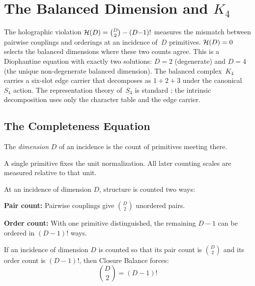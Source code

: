 \section{The Balanced Dimension and $K_4$}
\label{sec:balanced-dimension}

The holographic violation $\mathcal{H}(D) = \binom{D}{2} - (D{-}1)!$ measures the
mismatch between pairwise couplings and orderings at an incidence of~$D$
primitives. $\mathcal{H}(D)=0$ selects the balanced dimensions where these two counts
agree. This is a Diophantine equation with exactly two solutions: $D=2$
(degenerate) and $D=4$ (the unique non-degenerate balanced dimension). The
balanced complex~$K_4$ carries a six-slot edge carrier that decomposes as
$1{+}2{+}3$ under the canonical~$S_4$ action. The representation theory
of~$S_4$ is standard \cite{Serre1977,FultonHarris1991}; the intrinsic
decomposition uses only the character table and the edge carrier.

\subsection{The Completeness Equation}
\label{subsec:completeness-equation}

\begin{definition}[Dimension]\label{def:dimension}
The \emph{dimension} $D$ of an incidence is the count of primitives meeting there.
\end{definition}

\begin{definition}\label{def:fundamental-scale}
A single primitive fixes the unit normalization. All later counting scales are measured relative to that unit.
\end{definition}

At an incidence of dimension $D$, structure is counted two ways:

\textbf{Pair count:} Pairwise couplings give $\binom{D}{2}$ unordered pairs.

\textbf{Order count:} With one primitive distinguished, the remaining $D-1$ can be ordered in $(D-1)!$ ways.

\begin{theorem}[Completeness]\label{thm:completeness}
If an incidence of dimension $D$ is counted so that its pair count is $\binom{D}{2}$ and its order count is $(D-1)!$, then Closure Balance forces:
\begin{equation}
\boxed{\binom{D}{2} = (D-1)!}
\label{eq:completeness}
\end{equation}
\end{theorem}

